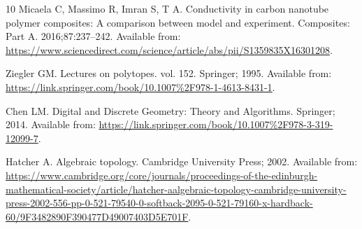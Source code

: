 \documentclass{elsarticle}
\theoremstyle{definition}
\begin{document}
\begin{thebibliography}{10}
Micaela C, Massimo R, Imran S, T A.
\newblock Conductivity in carbon nanotube polymer composites: A comparison
  between model and experiment.
\newblock Composites: Part A. 2016;87:237--242.
\newblock Available from:
  \url{https://www.sciencedirect.com/science/article/abs/pii/S1359835X16301208}.

Ziegler GM.
\newblock Lectures on polytopes. vol. 152.
\newblock Springer; 1995.
\newblock Available from:
  \url{https://link.springer.com/book/10.1007%2F978-1-4613-8431-1}.

Chen LM.
\newblock Digital and Discrete Geometry: Theory and Algorithms.
\newblock Springer; 2014.
\newblock Available from:
  \url{https://link.springer.com/book/10.1007%2F978-3-319-12099-7}.

Hatcher A.
\newblock Algebraic topology.
\newblock Cambridge University Press; 2002.
\newblock Available from:
  \url{https://www.cambridge.org/core/journals/proceedings-of-the-edinburgh-mathematical-society/article/hatcher-aalgebraic-topology-cambridge-university-press-2002-556-pp-0-521-79540-0-softback-2095-0-521-79160-x-hardback-60/9F3482890F390477D49007403D5E701F}.

\end{thebibliography}
\end{document}
